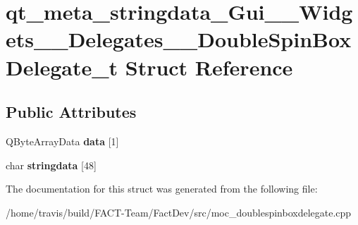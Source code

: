 \hypertarget{structqt__meta__stringdata__Gui____Widgets____Delegates____DoubleSpinBoxDelegate__t}{\section{qt\-\_\-meta\-\_\-stringdata\-\_\-\-Gui\-\_\-\-\_\-\-Widgets\-\_\-\-\_\-\-Delegates\-\_\-\-\_\-\-Double\-Spin\-Box\-Delegate\-\_\-t Struct Reference}
\label{structqt__meta__stringdata__Gui____Widgets____Delegates____DoubleSpinBoxDelegate__t}
}
\subsection*{Public Attributes}
\begin{DoxyCompactItemize}
\item 
\hypertarget{structqt__meta__stringdata__Gui____Widgets____Delegates____DoubleSpinBoxDelegate__t_af661960b06be84b9db03a37980407323}{Q\-Byte\-Array\-Data {\bfseries data} \mbox{[}1\mbox{]}}\label{structqt__meta__stringdata__Gui____Widgets____Delegates____DoubleSpinBoxDelegate__t_af661960b06be84b9db03a37980407323}

\item 
\hypertarget{structqt__meta__stringdata__Gui____Widgets____Delegates____DoubleSpinBoxDelegate__t_ae243b82f640358c894ca449cc3d0470f}{char {\bfseries stringdata} \mbox{[}48\mbox{]}}\label{structqt__meta__stringdata__Gui____Widgets____Delegates____DoubleSpinBoxDelegate__t_ae243b82f640358c894ca449cc3d0470f}

\end{DoxyCompactItemize}


The documentation for this struct was generated from the following file\-:\begin{DoxyCompactItemize}
\item 
/home/travis/build/\-F\-A\-C\-T-\/\-Team/\-Fact\-Dev/src/moc\-\_\-doublespinboxdelegate.\-cpp\end{DoxyCompactItemize}
